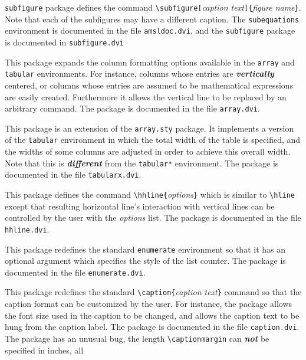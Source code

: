 \documentclass[11pt,titlepage]{article}
\begin{document}
\begin{description}
  \texttt{subfigure} package defines the command
  \verb+\subfigure[+\textit{caption text}\verb+]{+\textit{figure
      name}\verb+}+.  Note that each of the subfigures may have a different
  caption.  The \texttt{subequations} environment is documented in the file
  \verb+amsldoc.dvi+, and the \texttt{subfigure} package is
  documented in \verb+subfigure.dvi+
\item[\textmd{\texttt{array.sty:}}] This package expands the column formatting
  options available in the \texttt{array} and \texttt{tabular} environments.
  For instance, columns whose entries are \textbf{\textit{vertically}}
  centered, or columns whose entries are assumed to be mathematical
  expressions are easily created.  Furthermore it allows the vertical line to
  be replaced by an arbitrary command. The package is documented in the file
  \verb+array.dvi+.
\item[\textmd{\texttt{tabularx.sty:}}] This package is an extension of the
  \texttt{array.sty} package.  It implements a version of the \texttt{tabular}
  environment in which the total width of the table is specified, and the
  widths of some columns are adjusted in order to achieve this overall width.
  Note that this is \textbf{\textit{different}} from the \texttt{tabular*}
  environment.  The package is documented in the file
  \verb+tabularx.dvi+.
\item[\textmd{\texttt{hhline.sty:}}] This package defines the command
  \verb+\hhline{+\textit{options}\verb+}+ which is similar to \verb+\hline+
  except that resulting horizontal line's interaction with vertical lines can
  be controlled by the user with the \textit{options} list.  The package is
  documented in the file \verb+hhline.dvi+.
\item[\textmd{\texttt{enumerate.sty:}}] This package redefines the standard
  \texttt{enumerate} environment so that it has an optional argument which
  specifies the style of the list counter.  The package is documented in the
  file \verb+enumerate.dvi+.
\item[\textmd{\texttt{caption.sty:}}] This package redefines the standard
  \verb+\caption{+\textit{caption text}\verb+}+ command so that the caption
  format can be customized by the user.  For instance, the package allows the
  font size used in the caption to be changed, and allows the caption text to
  be hung from the caption label.  The package is documented in the file
  \verb+caption.dvi+.  The package has an unusual bug, the length
  \verb+\captionmargin+ can \textbf{\textit{not}} be specified in inches, all

\end{description}
\end{document}
